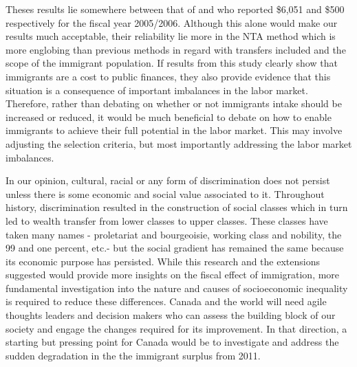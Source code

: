 \vspace{0.7em}\par
Theses results lie somewhere between that of \citet{Grubel:2012wo} and \citet{Javdani:2013gu} who reported \$6,051 and \$500 respectively for the fiscal year 2005/2006.
Although this alone would make our results much acceptable, their reliability lie more in the NTA method which is more englobing than previous methods in regard with transfers included and the scope of the immigrant population.
If results from this study clearly show that immigrants are a cost to public finances, they also provide evidence that this situation is a consequence of important imbalances in the labor market.
Therefore, rather than debating on whether or not immigrants intake should be increased or reduced, it would be much beneficial to debate on how to enable immigrants to achieve their full potential in the labor market.
This may involve adjusting the selection criteria, but most importantly addressing the labor market imbalances.

\vspace{0.7em}\par
In our opinion, cultural, racial or any form of discrimination does not persist unless there is some economic and social value associated to it.
Throughout history, discrimination resulted in the construction of social classes which in turn led to wealth transfer from lower classes to upper classes.
These classes have taken many names - proletariat and bourgeoisie, working class and nobility, the 99 and one percent, etc.- but the social gradient has remained the same because its economic purpose has persisted.
While this research and the extensions suggested would provide more insights on the fiscal effect of immigration, more fundamental investigation into the nature and causes of socioeconomic inequality is required to reduce these differences.
Canada and the world will need agile thoughts leaders and decision makers who can assess the building block of our society and engage the changes required for its improvement.
In that direction, a starting but pressing point for Canada would be to investigate and address the sudden degradation in the the immigrant surplus from 2011.